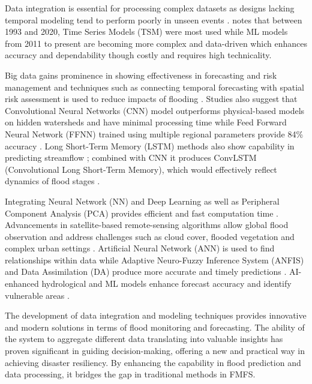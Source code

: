 \documentclass{research}
\begin{document}
Data integration is essential for processing complex datasets as designs lacking temporal modeling tend to perform poorly in unseen events \cite{feng2025comparative,gharehbaghi2025developing}. \cite{byaruhanga2024evolution} notes that between 1993 and 2020, Time Series Models (TSM) were most used while ML models from 2011 to present are becoming more complex and data-driven which enhances accuracy and dependability though costly and requires high technicality.

Big data gains prominence in showing effectiveness in forecasting and risk management \cite{ziyatbekova2025integrating,kommanaboina2024realtime} and techniques such as connecting temporal forecasting with spatial risk assessment is used to reduce impacts of flooding \cite{roohi2025hybrid}. Studies also suggest that Convolutional Neural Networks (CNN) model outperforms physical-based models on hidden watersheds and have minimal processing time \cite{gao2024enhancing,guo2022datadriven} while Feed Forward Neural Network (FFNN) trained using multiple regional parameters provide 84\% accuracy \cite{farooq2023ffm}. Long Short-Term Memory (LSTM) methods also show capability in predicting streamflow \cite{kordi2025integrating}; combined with CNN it produces ConvLSTM (Convolutional Long Short-Term Memory), which would effectively reflect dynamics of flood stages \cite{priyadharshini2025convlstm}.

Integrating Neural Network (NN) and Deep Learning as well as Peripheral Component Analysis (PCA) provides efficient and fast computation time \cite{guo2020datadriven,mou2025ai,rana2024fusion}. Advancements in satellite-based remote-sensing algorithms allow global flood observation and address challenges such as cloud cover, flooded vegetation and complex urban settings \cite{aravamudan2025superresolution,fawakherji2025flood,schumann2023flood}. Artificial Neural Network (ANN) is used to find relationships within data while Adaptive Neuro-Fuzzy Inference System (ANFIS) and Data Assimilation (DA) produce more accurate and timely predictions \cite{seydi2022fusion,annis2021gfplain}. AI-enhanced hydrological and ML models enhance forecast accuracy and identify vulnerable areas \cite{ougahi2025enhanced,yang2024advancing}.

The development of data integration and modeling techniques provides innovative and modern solutions in terms of flood monitoring and forecasting. The ability of the system to aggregate different data translating into valuable insights has proven significant in guiding decision-making, offering a new and practical way in achieving disaster resiliency. By enhancing the capability in flood prediction and data processing, it bridges the gap in traditional methods in FMFS.
\end{document}
